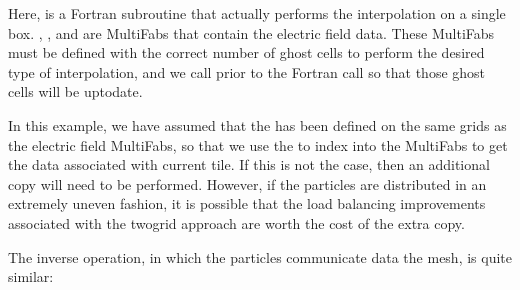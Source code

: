\documentclass[letterpaper,10pt,english]{sphinxmanual}
\begin{document}
\begin{sphinxVerbatim}[commandchars=\\\{\}]
      
                      
                        
\end{sphinxVerbatim}

\sphinxAtStartPar
Here,  is a Fortran subroutine that actually performs
the interpolation on a single box. , , and  are
MultiFabs that contain the electric field data. These MultiFabs must be defined
with the correct number of ghost cells to perform the desired type of
interpolation, and we call  prior to the Fortran call so
that those ghost cells will be up\sphinxhyphen{}to\sphinxhyphen{}date.

\sphinxAtStartPar
In this example, we have assumed that the  has
been defined on the same grids as the electric field MultiFabs, so that we use
the  to index into the MultiFabs to get the data associated with
current tile. If this is not the case, then an additional copy will need to be
performed. However, if the particles are distributed in an extremely uneven
fashion, it is possible that the load balancing improvements associated with
the two\sphinxhyphen{}grid approach are worth the cost of the extra copy.

\sphinxAtStartPar
The inverse operation, in which the particles communicate data  the mesh,
is quite similar:
\end{document}
